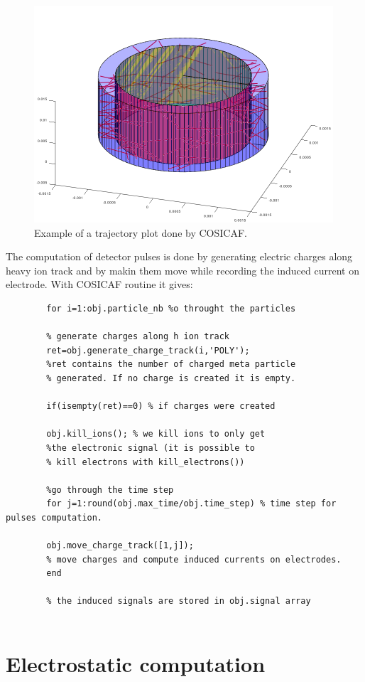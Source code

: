 \documentclass[10pt]{article}
\begin{document}
			\begin{figure}[!htb]
			\centering
			\includegraphics[scale=1.3]{100trajectoires.pdf}
			\caption{Example of a trajectory plot done by COSICAF.}   
			\label{fig:100trajectoires}
		\end{figure}
		The computation of detector pulses is done by generating electric charges along heavy ion track and by makin them move while recording the induced current on electrode. With COSICAF routine it gives:
		
		\begin{lstlisting}
		for i=1:obj.particle_nb %o throught the particles
		
		% generate charges along h ion track
		ret=obj.generate_charge_track(i,'POLY');
		%ret contains the number of charged meta particle
		% generated. If no charge is created it is empty.
		
		if(isempty(ret)==0) % if charges were created
		
		obj.kill_ions(); % we kill ions to only get
		%the electronic signal (it is possible to
		% kill electrons with kill_electrons())
		
		%go through the time step		
		for j=1:round(obj.max_time/obj.time_step) % time step for pulses computation.
		
		obj.move_charge_track([1,j]);  
		% move charges and compute induced currents on electrodes.
		end
		
		% the induced signals are stored in obj.signal array
		
		\end{lstlisting}
		
	\section{Electrostatic computation}
	
\end{document}
